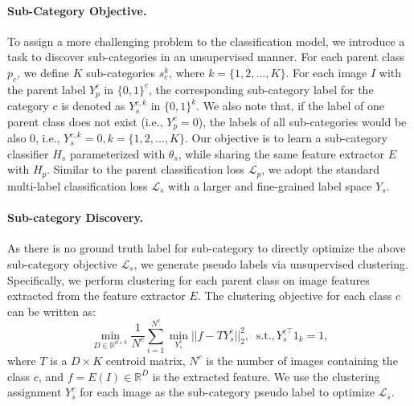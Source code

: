 \documentclass[10pt,twocolumn,letterpaper]{article}
\begin{document}
\paragraph{Sub-Category Objective.}
To assign a more challenging problem to the classification model, we introduce a task to discover sub-categories in an unsupervised manner.
For each parent class $p_c$, we define $K$ sub-categories $s_c^k$, where $k = \{1,2, ... ,K\}$.
For each image $I$ with the parent label $Y_p^c$ in $\{0, 1\}^{c}$, the corresponding sub-category label for the category $c$ is denoted as $Y_s^{c,k}$ in $\{0, 1\}^{k}$.
We also note that, if the label of one parent class does not exist (i.e., $Y_p^c = 0$), the labels of all sub-categories would be also 0, i.e., $Y_s^{c,k} = 0, k = \{1,2,...,K\}$.
Our objective is to learn a sub-category classifier $H_s$ parameterized with $\theta_s$, while sharing the same feature extractor $E$ with $H_p$. 
Similar to the parent classification loss $\mathcal{L}_p$, we adopt the standard multi-label classification loss $\mathcal{L}_s$ with a larger and fine-grained label space $Y_s$.







\vspace{-3mm}
\paragraph{Sub-category Discovery.}
As there is no ground truth label for sub-category to directly optimize the above sub-category objective $\mathcal{L}_s$, we generate pseudo labels via unsupervised clustering. 
Specifically, we perform clustering for each parent class on image features extracted from the feature extractor $E$.
The clustering objective for each class $c$ can be written as:
\begin{equation}
    \min_{D \in \mathbb{R}^{d \times k}} \frac{1}{N^c} \sum_{i=1}^{N^c} \min_{Y_s^c} ||f - TY_s^c||_2^2, \;\;\text{s.t.}, Y_{s}^{c \top} 1_k = 1,
    \label{eq:clustering}
\end{equation}
where $T$ is a $D \times K$ centroid matrix, $N^c$ is the number of images containing the class $c$, and $f = E(I) \in \mathbb{R}^D$ is the extracted feature.
We use the clustering assignment $Y_s^c$ for each image as the sub-category pseudo label to optimize $\mathcal{L}_s$.






\vspace{-3mm}
\end{document}
